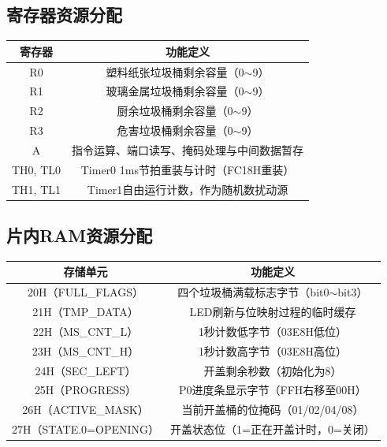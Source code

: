 \documentclass[12pt,a4paper]{article}
\begin{document}
\subsection{寄存器资源分配}
\begin{table}[H]
    \centering
    \small
    \begin{tabular}{|c|c|}
        \hline
        寄存器 & 功能定义 \\
        \hline
        R0 & 塑料纸张垃圾桶剩余容量（0$\sim$9） \\
        \hline
        R1 & 玻璃金属垃圾桶剩余容量（0$\sim$9） \\
        \hline
        R2 & 厨余垃圾桶剩余容量（0$\sim$9） \\
        \hline
        R3 & 危害垃圾桶剩余容量（0$\sim$9） \\
        \hline
        A & 指令运算、端口读写、掩码处理与中间数据暂存 \\
        \hline
        TH0, TL0 & Timer0 1ms节拍重装与计时（FC18H重装） \\
        \hline
        TH1, TL1 & Timer1自由运行计数，作为随机数扰动源 \\
        \hline
    \end{tabular}
\end{table}

\subsection{片内RAM资源分配}
\begin{table}[H]
    \centering
    \small
    \begin{tabular}{|c|c|}
        \hline
        存储单元 & 功能定义 \\
        \hline
        20H（FULL\_FLAGS） & 四个垃圾桶满载标志字节（bit0$\sim$bit3） \\
        \hline
        21H（TMP\_DATA） & LED刷新与位映射过程的临时缓存 \\
        \hline
        22H（MS\_CNT\_L） & 1秒计数低字节（03E8H低位） \\
        \hline
        23H（MS\_CNT\_H） & 1秒计数高字节（03E8H高位） \\
        \hline
        24H（SEC\_LEFT） & 开盖剩余秒数（初始化为8） \\
        \hline
        25H（PROGRESS） & P0进度条显示字节（FFH右移至00H） \\
        \hline
        26H（ACTIVE\_MASK） & 当前开盖桶的位掩码（01/02/04/08） \\
        \hline
        27H（STATE.0=OPENING） & 开盖状态位（1=正在开盖计时，0=关闭） \\
        \hline
    \end{tabular}
\end{table}
\end{document}
